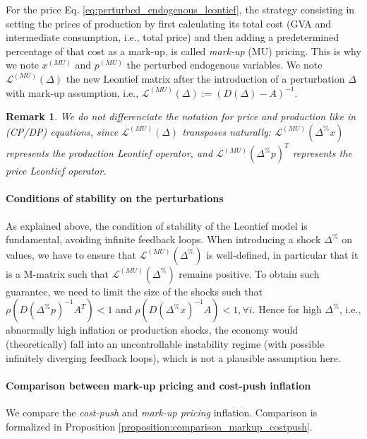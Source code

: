 \documentclass{article}
\newtheorem{remark}{Remark}
\begin{document}
\vspace{0.1cm}

For the price Eq. \eqref{eq:perturbed_endogenous_leontief}, the strategy consisting in setting the prices of production by first calculating its total cost (GVA and intermediate consumption, i.e., total price) and then adding a predetermined percentage of that cost as a mark-up, is called \textit{mark-up} (MU) pricing. This is why we note $x^{(MU)}$ and $p^{(MU)}$ the perturbed endogenous variables. We note $\mathcal{L}^{(MU)}(\Delta)$ the new Leontief matrix after the introduction of a perturbation $\Delta$ with mark-up assumption, i.e., $\mathcal{L}^{(MU)}(\Delta) := \left( D(\Delta) - A \right)^{-1}$. 

\begin{remark}
We do not differenciate the notation for price and production like in (CP/DP) equations, since $\mathcal{L}^{(MU)}(\Delta)$ transposes naturally: $\mathcal{L}^{(MU)}(\Delta^\% x)$ represents the production Leontief operator, and $\mathcal{L}^{(MU)}(\Delta^\% p)^T$ represents the price Leontief operator.
\end{remark}

\paragraph{Conditions of stability on the perturbations} As explained above, the condition of stability of the Leontief model is fundamental, avoiding infinite feedback loops. When introducing a shock $\Delta^{\%}$ on values, we have to ensure that $\mathcal{L}^{(MU)}(\Delta^\%)$ is well-defined, in particular that it is a M-matrix such that $\mathcal{L}^{(MU)}(\Delta^\%)$ remains positive. To obtain such guarantee, we need to limit the size of the shocks such that $\rho(D(\Delta^\% p)^{-1} A^T)<1$ and $\rho(D(\Delta^\% x)^{-1} A)<1, \forall i$. Hence for high $\Delta^\%$, i.e., abnormally high inflation or production shocks, the economy would (theoretically) fall into an uncontrollable instability regime (with possible infinitely diverging feedback loops), which is not a plausible assumption here. 

\vspace{0.1cm}

\paragraph{Comparison between mark-up pricing and cost-push inflation} We compare the \textit{cost-push} and \textit{mark-up pricing} inflation. 
Comparison is formalized in Proposition \ref{proposition:comparison_markup_costpush}. 
\end{document}
